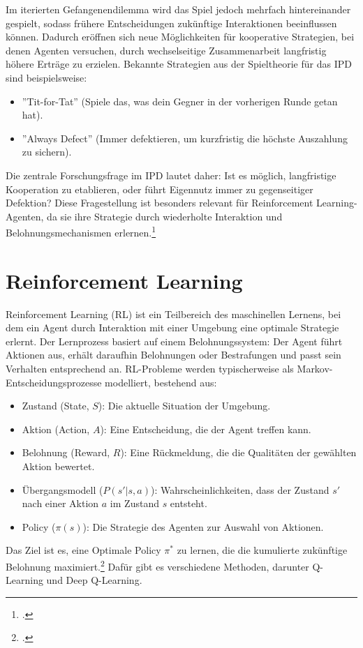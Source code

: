 Im iterierten Gefangenendilemma wird das Spiel jedoch mehrfach hintereinander 
gespielt, sodass frühere Entscheidungen zukünftige Interaktionen beeinflussen können. 
Dadurch eröffnen sich neue Möglichkeiten für kooperative Strategien, bei denen 
Agenten versuchen, durch wechselseitige Zusammenarbeit langfristig höhere Erträge 
zu erzielen. Bekannte Strategien aus der Spieltheorie für das IPD sind beispielsweise:
\begin{itemize}
    \item ''Tit-for-Tat'' (Spiele das, was dein Gegner in der vorherigen Runde getan hat).
    \item ''Always Defect'' (Immer defektieren, um kurzfristig die höchste Auszahlung zu sichern).
\end{itemize}

Die zentrale Forschungsfrage im IPD lautet daher: Ist es möglich, langfristige 
Kooperation zu etablieren, oder führt Eigennutz immer zu gegenseitiger Defektion? 
Diese Fragestellung ist besonders relevant für Reinforcement Learning-Agenten, da 
sie ihre Strategie durch wiederholte Interaktion und Belohnungsmechanismen erlernen.\footcite{axelrod1984cooperation}

\section{Reinforcement Learning}
Reinforcement Learning (RL) ist ein Teilbereich des maschinellen Lernens, bei dem 
ein Agent durch Interaktion mit einer Umgebung eine optimale Strategie erlernt. 
Der Lernprozess basiert auf einem Belohnungssystem: Der Agent führt Aktionen aus, 
erhält daraufhin Belohnungen oder Bestrafungen und passt sein Verhalten 
entsprechend an. RL-Probleme werden typischerweise als Markov-Entscheidungsprozesse 
modelliert, bestehend aus:
\begin{itemize}
    \item Zustand (State, $S$): Die aktuelle Situation der Umgebung.
    \item Aktion (Action, $A$): Eine Entscheidung, die der Agent treffen kann.
    \item Belohnung (Reward, $R$): Eine Rückmeldung, die die Qualitäten der gewählten Aktion bewertet.
    \item Übergangsmodell ($P(s' \vert s, a)$): Wahrscheinlichkeiten, dass der Zustand $s'$ nach einer Aktion $a$ im Zustand $s$ entsteht.
    \item Policy ($\pi(s)$): Die Strategie des Agenten zur Auswahl von Aktionen.
\end{itemize}
Das Ziel ist es, eine Optimale Policy $\pi^*$ zu lernen, die die kumulierte zukünftige Belohnung maximiert.\footcite{sutton2018reinforcement} 
Dafür gibt es verschiedene Methoden, darunter Q-Learning und Deep Q-Learning.

